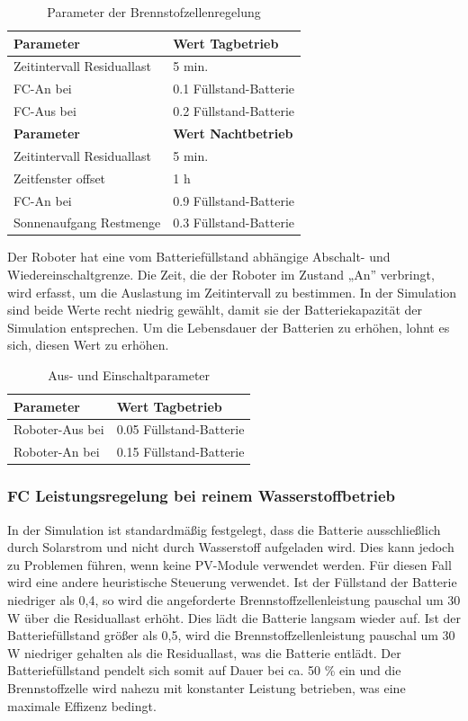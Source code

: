 \begin{table}
\centering
\begin{tabular}{|l|l|}
\hline
\textbf{Parameter} & \textbf{Wert Tagbetrieb} \\ \hline
Zeitintervall Residuallast & 5 min. \\ \hline
FC-An bei & 0.1 Füllstand-Batterie \\ \hline
FC-Aus bei & 0.2 Füllstand-Batterie \\ \hline
\textbf{Parameter} & \textbf{Wert Nachtbetrieb} \\ \hline
Zeitintervall Residuallast & 5 min. \\ \hline
Zeitfenster offset & 1 h \\ \hline
FC-An bei & 0.9 Füllstand-Batterie \\ \hline
Sonnenaufgang Restmenge & 0.3 Füllstand-Batterie \\ \hline
\end{tabular}
\caption{Parameter der Brennstofzellenregelung}
\label{tab:paramregelung}
\end{table}

Der Roboter hat eine vom Batteriefüllstand abhängige Abschalt- und Wiedereinschaltgrenze. Die Zeit, die der Roboter im Zustand „An” verbringt, wird erfasst, um die Auslastung im Zeitintervall zu bestimmen. In der Simulation sind beide Werte recht niedrig gewählt, damit sie der Batteriekapazität der Simulation entsprechen. Um die Lebensdauer der Batterien zu erhöhen, lohnt es sich, diesen Wert zu erhöhen. \\



\begin{table}
\centering
\begin{tabular}{|l|l|}
\hline
\textbf{Parameter} & \textbf{Wert Tagbetrieb} \\ \hline
Roboter-Aus bei & 0.05 Füllstand-Batterie \\ \hline
Roboter-An bei & 0.15 Füllstand-Batterie \\ \hline
\end{tabular}
\caption{Aus- und Einschaltparameter}
\end{table}

\subsubsection{FC Leistungsregelung bei reinem Wasserstoffbetrieb}
In der Simulation ist standardmäßig festgelegt, dass die Batterie ausschließlich durch Solarstrom und nicht durch Wasserstoff aufgeladen wird. Dies kann jedoch zu Problemen führen, wenn keine PV-Module verwendet werden. Für diesen Fall wird eine andere heuristische Steuerung verwendet. Ist der Füllstand der Batterie niedriger als 0,4, so wird die angeforderte Brennstoffzellenleistung pauschal um 30 W über die Residuallast erhöht. Dies lädt die Batterie langsam wieder auf. Ist der Batteriefüllstand größer als 0,5, wird die Brennstoffzellenleistung pauschal um 30 W niedriger gehalten als die Residuallast, was die Batterie entlädt. Der Batteriefüllstand pendelt sich somit auf Dauer bei ca. 50 \% ein und die Brennstoffzelle wird nahezu mit konstanter Leistung betrieben, was eine maximale Effizenz bedingt.

